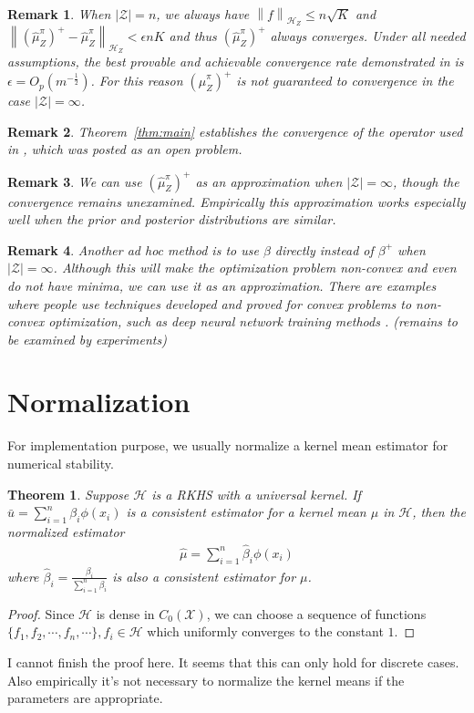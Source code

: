\documentclass[a4paper]{article}
\renewcommand{\cal}{\mathcal}
\newcommand{\norm}[1]{\left\lVert#1\right\rVert}
\newtheorem{theorem}{Theorem}
\newtheorem{remark}{Remark}
\newcommand{\thmref}[1]{Theorem~\ref{#1}}
\begin{document}
\begin{remark}
When $|\cal{Z}| = n$, we always have $\norm{f}_{\cal{H}_Z} \leq n\sqrt{K}$ and $\norm{(\widehat{\mu}_Z^\pi)^+ - \widehat{\mu}_Z^\pi}_{\cal{H}_Z} < \epsilon n K$ and thus $(\widehat{\mu}_Z^\pi)^+$ always converges. Under all needed assumptions, the best provable and achievable convergence rate demonstrated in \cite{fukumizu2011kernel} is $\epsilon = O_p(m^{-\frac{1}{2}})$. For this reason $(\widehat{\mu}_Z^\pi)^+$ is not guaranteed to convergence in the case $|\cal{Z}| = \infty$.
\end{remark}
\begin{remark}
\thmref{thm:main} establishes the convergence of the operator used in \cite{nishiyama2012hilbert}, which was posted as an open problem.
\end{remark}
\begin{remark}
We can use $(\widehat{\mu}_Z^\pi)^+$ as an approximation when $|\cal{Z}| = \infty$, though the convergence remains unexamined. Empirically this approximation works especially well when the prior and posterior distributions are similar.
\end{remark}
\begin{remark}
Another ad hoc method is to use $\beta$ directly instead of $\beta^+$ when $|\cal{Z}| = \infty$. Although this will make the optimization problem non-convex and even do not have minima, we can use it as an approximation. There are examples where people use techniques developed and proved for convex problems to non-convex optimization, such as deep neural network training methods \cite{nesterov1983method}\cite{duchi2011adaptive}. ({\color{red}remains to be examined by experiments})
\end{remark}
\section{Normalization}
For implementation purpose, we usually normalize a kernel mean estimator for numerical stability.
\begin{theorem}
Suppose $\cal{H}$ is a RKHS with a universal kernel. If $\bar{u} = \sum_{i=1}^n \beta_i \phi(x_i)$ is a consistent estimator for a kernel mean $\mu$ in $\cal{H}$, then the normalized estimator
\begin{align}
\hat{\mu} = \sum_{i=1}^n \hat{\beta}_i \phi(x_i)
\end{align}
where $\hat{\beta}_i = \frac{\beta_i}{\sum_{i=1}^n \beta_i}$ is also a consistent estimator for $\mu$.
\end{theorem}
\begin{proof}
Since $\cal{H}$ is dense in $C_0(\cal{X})$, we can choose a sequence of functions $\{f_1,f_2,\cdots,f_n,\cdots\}, f_i \in \cal{H}$ which uniformly converges to the constant $1$. 
\end{proof}
{\color{red} I cannot finish the proof here. It seems that this can only hold for discrete cases. Also empirically it's not necessary to normalize the kernel means if the parameters are appropriate.}
\end{document}
